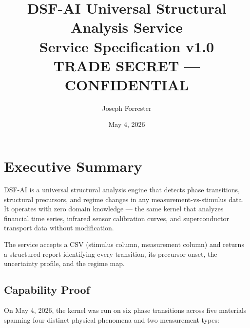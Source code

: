 \documentclass[11pt,letterpaper]{article}
\title{%
  \textbf{DSF-AI Universal Structural Analysis Service} \\[6pt]
  \large Service Specification v1.0 \\[4pt]
  \textcolor{confidential}{\textbf{TRADE SECRET --- CONFIDENTIAL}}
}
\author{Joseph Forrester}
\date{May 4, 2026}
\begin{document}
\maketitle
\thispagestyle{fancy}

\begin{center}
\end{center}

\tableofcontents
\newpage

\section{Executive Summary}

DSF-AI is a universal structural analysis engine that detects phase
transitions, structural precursors, and regime changes in any
measurement-vs-stimulus data. It operates with zero domain knowledge ---
the same kernel that analyzes financial time series, infrared sensor
calibration curves, and superconductor transport data without modification.

The service accepts a CSV (stimulus column, measurement column) and
returns a structured report identifying every transition, its precursor
onset, the uncertainty profile, and the regime map.

\subsection{Capability Proof}

On May 4, 2026, the kernel was run on six phase transitions across
five materials spanning four distinct physical phenomena and two
measurement types:
\end{document}
